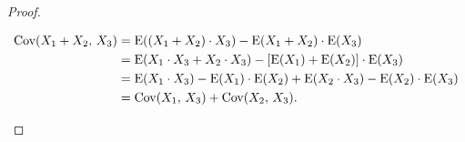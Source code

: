 \begin{proof}
\begin{enumerate}
                    \begin{align*}
                        \text{Cov}(X_1+X_2,\,X_3) &= \text{E}((X_1+X_2)\cdot X_3) - \text{E}(X_1+X_2) \cdot \text{E}(X_3) \\
                        &= \text{E}(X_1 \cdot X_3 + X_2 \cdot X_3) - \left[\text{E}(X_1)+\text{E}(X_2)\right]\cdot \text{E}(X_3) \\
                        &= \text{E}(X_1 \cdot X_3) - \text{E}(X_1)\cdot \text{E}(X_2) + \text{E}(X_2 \cdot X_3) - \text{E}(X_2)\cdot \text{E}(X_3) \\
                        &= \text{Cov}(X_1,\,X_3) + \text{Cov}(X_2,\,X_3) \qedhere
                    .\end{align*}
            \end{enumerate}
        \end{proof}
